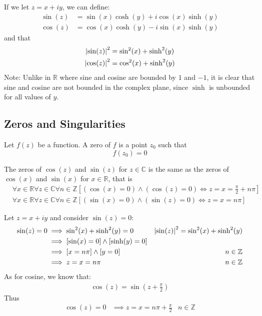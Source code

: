 \documentclass[12pt, english]{book}
\makeatletter
\renewenvironment{proof}[1][\proofname]{\par
	\pushQED{\qed}%
	\normalfont \topsep6\p@\@plus6\p@\relax
	\list{}{%
		\settowidth{\leftmargin}{\itshape\proofname:\hskip\labelsep}%
		\setlength{\labelwidth}{0pt}%
		\setlength{\itemindent}{-\leftmargin}%
	}%
	\item[\hskip\labelsep\itshape#1\@addpunct{:}]\ignorespaces
	}{ \popQED\endlist\@endpefalse}
\makeatother
\begin{document}
	If we let \(z = x + iy\), we can define:
	\begin{align*}
		\sin(z) &= \sin(x) \cosh(y) + i\cos(x) \sinh(y) \\
		\cos(z) &= \cos(x) \cosh(y) - i\sin(x) \sinh(y)
	\end{align*}
	and that 
	\begin{align*}
		\abs{\sin(z)}^2 &= \sin[2](x) + \sinh[2](y)\\
		\abs{\cos(z)}^2 &= \cos[2](x) + \sinh[2](y)
	\end{align*}
	Note: Unlike in \(\mathbb{R}\) where sine and cosine are bounded by \(1\) and \(-1\), 
	it is clear that sine and cosine are not bounded in the complex plane, since \(\sinh\) is unbounded for all values of \(y\). 
	
	\subsection{Zeros and Singularities} \label{Zeros and Singularities (Trig) Subsection - Complex}
	
	\begin{definition}
		\label{Zero (function) Definition - Complex}
		Let \(f(z)\) be a function. A zero of \(f\) is a point \(z_0\) such that 
		\[f(z_0) = 0\]
	\end{definition}
	
	\begin{theorem}
		The zeros of \(\cos(z)\) and \(\sin(z)\) for \(z \in \mathbb{C}\) is the same as the zeros of \(\cos(x)\) and \(\sin(x)\) for \(x \in \mathbb{R}\), that is 
		\begin{align*}
			&\forall x \in \mathbb{R} \forall z \in \mathbb{C} \forall n \in \mathbb{Z}
			\left[(\cos(x) = 0) \land (\cos(z) = 0) \iff z = x = \frac{\pi}{2} + n \pi \right] \\
			&\forall x \in \mathbb{R} \forall z \in \mathbb{C} \forall n \in \mathbb{Z}
			\left[(\sin(x) = 0) \land (\sin(z) = 0) \iff z = x = n\pi \right]
		\end{align*}
	\end{theorem}	
	\begin{proof}
		Let \(z = x + iy\) and consider \(\sin(z) = 0\):
		\begin{align*}
			\sin(z) = 0 
			&\implies \sin[2](x) + \sinh[2](y) = 0 & \abs{\sin(z)}^2 = \sin[2](x) + \sinh[2](y) \\
			&\implies [\sin(x) = 0] \land [\sinh(y) = 0] \\
			&\implies [x = n\pi] \land [y = 0] & n \in \mathbb{Z}\\
			&\implies z = x = n \pi & n \in \mathbb{Z}
		\end{align*}
		As for cosine, we know that:
		\begin{align*}
			\cos(z) = \sin \left(z + \frac{\pi}{2}\right)
		\end{align*}
		Thus
		\begin{align*}
			\cos(z) = 0 &\implies z = x = n \pi + \frac{\pi}{2} & n \in \mathbb{Z}
		\end{align*}
	\end{proof}
\end{document}

